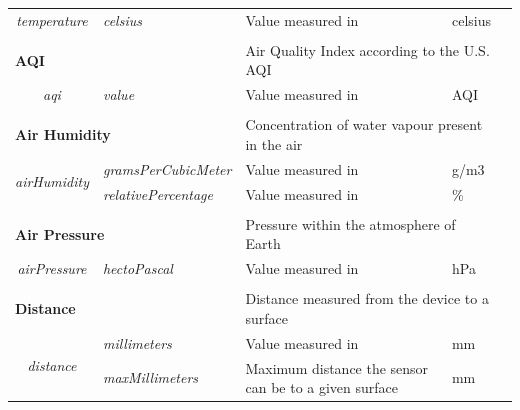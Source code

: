 \begin{landscape}
\begin{longtable}{cllll}
   \textit{temperature}                  & \textit{celsius}                   & Value measured in                                      & celsius                        &  \\ [0.4em] \cline{1-4}
   \\[-0.85em]
   \multicolumn{2}{l}{\textbf{AQI}}                                           & \multicolumn{2}{l}{Air Quality Index according to the U.S. AQI}                         &  \\
   \textit{aqi}                          & \textit{value}                     & Value measured in                                      & AQI                            &  \\ [0.4em] \cline{1-4}
   \\[-0.85em]
   \multicolumn{2}{l}{\textbf{Air Humidity}}                                  & \multicolumn{2}{l}{Concentration of water vapour present in the air}                    &  \\
   \multirow{2}{*}{\textit{airHumidity}} & \textit{gramsPerCubicMeter}        & Value measured in                                      & g/m3                           &  \\
                                         & \textit{relativePercentage}        & Value measured in                                      & \%                             &  \\ [0.4em] \cline{1-4}
   \\[-0.85em]
   \multicolumn{2}{l}{\textbf{Air Pressure}}                                  & \multicolumn{2}{l}{Pressure within the atmosphere of Earth}                             &  \\
   \textit{airPressure}                  & \textit{hectoPascal}               & Value measured in                                      & hPa                            &  \\ [0.4em] \cline{1-4}
   \\[-0.85em]
   \multicolumn{2}{l}{\textbf{Distance}}                                      & \multicolumn{2}{l}{Distance measured from the device to a surface}                      &  \\
   \multirow{3}{*}{\textit{distance}}    & \textit{millimeters}               & Value measured in                                      & mm                             &  \\
                                         & \textit{maxMillimeters}            & Maximum distance the sensor can be to a given surface  & mm                             &  \\

\end{longtable}
\end{landscape}
